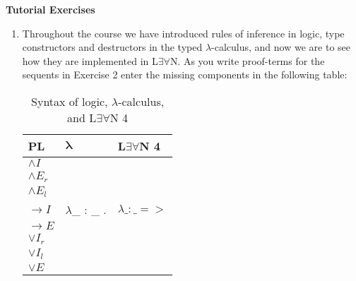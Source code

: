 \documentclass[11pt]{report}
\begin{document}
\newpage
{\bf Tutorial Exercises}

\begin{enumerate}
	
	\item Throughout the course we have introduced rules of inference in logic, type constructors and destructors in the typed $\lambda$-calculus, and now we are to see how they are implemented in L$\exists\forall$N. As you write proof-terms for the sequents in Exercise 2 enter the missing components in the following table: 
	
	\begin{table}[htbp]
		\centering
		\begin{tabular}{p{2cm} p{2cm} p{2cm}}
			\textbf{PL} & $\boldsymbol{\lambda}$ & \textbf{L$\exists\forall$N 4} \\
			\hline
			$\land I$& & \\ 
			$\land E_{r}$& & \\
			$\land E_{l}$& & \\
			$\to I$& $\lambda$\_ : \_ . & $\lambda \_ : \_ =>$\\
			$\to E$& & \\
			$\lor I_{r}$& & \\
			$\lor I_{l}$& & \\
			$\lor E$& & 
		\end{tabular}
		\caption{Syntax of logic, $\lambda$-calculus, and L$\exists\forall$N 4}
		\label{tab:your_table_label}
	\end{table}

	

\end{enumerate}
\end{document}
